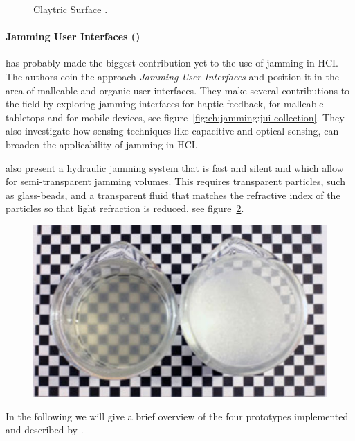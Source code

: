 \begin{figure}
\begin{minipage}[t]{.44\textwidth}
    \caption[Claytric Surface by \citet{matoba2012claytricsurface}.]
    {Claytric Surface \citep{matoba2012claytricsurface}.}
    \label{fig:ch:jamming:claytric-surface}
  \end{minipage}
\end{figure}

\paragraph{Jamming User Interfaces (\citeyear{follmer2012jamming})}
\label{ch:jamming:related-work:hci:jui} 
\citet{follmer2012jamming} has probably made the biggest contribution yet to the use of jamming in HCI. 
The authors coin the approach \textit{Jamming User Interfaces} and position it in the area of malleable and organic user interfaces. 
They make several contributions to the field by exploring jamming interfaces for haptic feedback, for malleable tabletops and for mobile devices, see figure~\ref{fig:ch:jamming:jui-collection}. 
They also investigate how sensing techniques like capacitive and optical sensing, can broaden the applicability of jamming in HCI. 

\citet{follmer2012jamming} also present a hydraulic jamming system that is fast and silent and which allow for semi-transparent jamming volumes. 
This requires transparent particles, such as glass-beads, and a transparent fluid that matches the refractive index of the particles so that light refraction is reduced, see figure~\ref{fig:ch:jamming:jui:refractive}. 

\begin{figure}[h]
  \centering
  \begin{minipage}[b]{.7\textwidth}
    \centering
    \includegraphics[width=.5\linewidth]{figures/jamming/refractive-index}
    \label{fig:ch:jamming:jui:refractive}
  \end{minipage}
\end{figure}

In the following we will give a brief overview of the four prototypes implemented and described by \citet{follmer2012jamming}.


